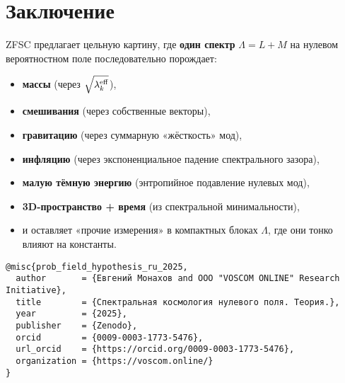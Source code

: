\documentclass[12pt,a4paper]{article}
\begin{document}
\section{Заключение}

ZFSC предлагает цельную картину, где \textbf{один спектр} \(\Lambda = L + M\) на нулевом вероятностном поле последовательно порождает:

\begin{itemize}
    \item \textbf{массы} (через \(\sqrt{\lambda_k^{\rm eff}}\)),
    \item \textbf{смешивания} (через собственные векторы),
    \item \textbf{гравитацию} (через суммарную «жёсткость» мод),
    \item \textbf{инфляцию} (через экспоненциальное падение спектрального зазора),
    \item \textbf{малую тёмную энергию} (энтропийное подавление нулевых мод),
    \item \textbf{3D-пространство + время} (из спектральной минимальности),
    \item и оставляет «прочие измерения» в компактных блоках \(\Lambda\), где они тонко влияют на константы.
\end{itemize}

\begin{verbatim}
@misc{prob_field_hypothesis_ru_2025,
  author       = {Евгений Монахов and ООО "VOSCOM ONLINE" Research Initiative},
  title        = {Спектральная космология нулевого поля. Теория.},
  year         = {2025},
  publisher    = {Zenodo},
  orcid        = {0009-0003-1773-5476},
  url_orcid    = {https://orcid.org/0009-0003-1773-5476},
  organization = {https://voscom.online/}
}
\end{verbatim}
\end{document}
